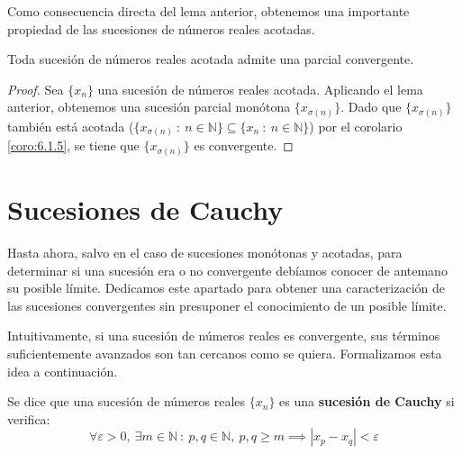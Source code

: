 Como consecuencia directa del lema anterior, obtenemos una importante propiedad de las sucesiones de números reales acotadas.
\begin{teo}
    Toda sucesión de números reales acotada admite una parcial convergente.
\end{teo}
\begin{proof}
    Sea $\{x_n\}$ una sucesión de números reales acotada. Aplicando el lema anterior,
    obtenemos una sucesión parcial monótona $\{x_{\sigma(n)}\}$. Dado que $\{x_{\sigma(n)}\}$ también
    está acotada ($\{x_{\sigma(n)} ~:~ n \in \mathbb{N}\} \subseteq \{x_n ~:~ n \in \mathbb{N}\}$)
    por el corolario \ref{coro:6.1.5}, se tiene que $\{x_{\sigma(n)}\}$ es convergente.
\end{proof}


\section{Sucesiones de Cauchy}
Hasta ahora, salvo en el caso de sucesiones monótonas y acotadas, para determinar si una sucesión era o no
convergente debíamos conocer de antemano su posible límite. Dedicamos este apartado para obtener una caracterización de las sucesiones convergentes sin presuponer el conocimiento de un posible límite.

Intuitivamente, si una sucesión de números reales es convergente, sus términos suficientemente avanzados son tan cercanos como se quiera. Formalizamos esta idea a continuación.
\begin{definicion}
    Se dice que una sucesión de números reales $\{x_n\}$ es una \textbf{sucesión de Cauchy} si verifica:
    \begin{equation*}
        \forall \varepsilon > 0, ~ \exists m \in \mathbb{N} ~:~ p,q \in \mathbb{N}, ~ p,q \geq m \implies |x_p - x_q| < \varepsilon
    \end{equation*}
\end{definicion}

